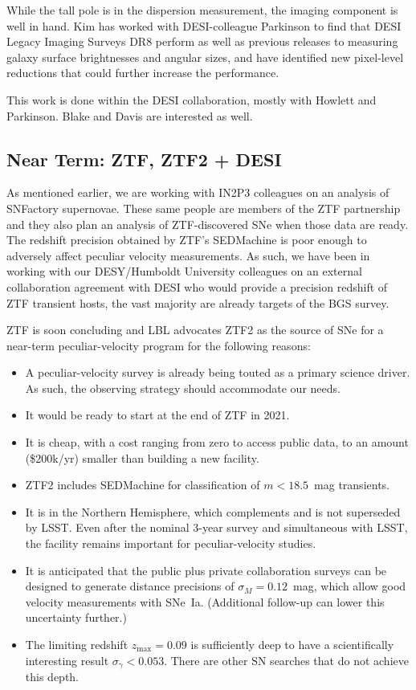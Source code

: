 While the tall pole is in the dispersion measurement, the
imaging component is well in hand. Kim has worked with DESI-colleague Parkinson to find that DESI Legacy Imaging Surveys DR8  perform
as well as previous releases to measuring galaxy surface brightnesses and angular sizes, and have identified new
pixel-level reductions that could further increase the performance.

This work is done within the DESI collaboration, mostly with Howlett and Parkinson.  Blake and Davis are interested as well.

\subsection{Near Term: ZTF, ZTF2 + DESI}
As mentioned earlier, we are working with IN2P3 colleagues on an analysis of SNFactory supernovae.
These same people are members of the ZTF partnership and they also plan an analysis of ZTF-discovered 
SNe when those data are ready.  The redshift precision obtained by ZTF's SEDMachine is poor enough
to adversely affect peculiar velocity measurements.  As such, we have been in working with our DESY/Humboldt University
colleagues on an external collaboration agreement with DESI who would provide a precision redshift of ZTF transient hosts,
the vast majority are already targets of the BGS survey.

ZTF is soon concluding and LBL advocates ZTF2 as the source of SNe for a near-term peculiar-velocity program
for the following reasons:
\begin{itemize}
\item A peculiar-velocity survey is already being touted as a primary science driver. As such,
the observing strategy should accommodate our needs.
\item It would be ready to start at the end of ZTF in 2021.
\item It is cheap, with a cost ranging from zero to access public data, to an amount (\$200k/yr) smaller
than building a new facility.
\item ZTF2 includes SEDMachine for classification of $m<18.5$~mag  transients.
\item It is in the Northern Hemisphere, which complements and is not superseded by LSST. 
Even after the nominal 3-year survey and simultaneous with LSST, the facility remains important for peculiar-velocity studies.
\item It is anticipated that the public plus private collaboration surveys can be designed to generate distance
precisions of $\sigma_M =0.12$~mag, which allow good velocity measurements with SNe~Ia.  (Additional follow-up can lower this uncertainty further.)
\item The limiting redshift $z_{\text{max}} =0.09$ is sufficiently deep  to have a scientifically interesting result $\sigma_\gamma < 0.053$.
There are other SN searches that do not achieve this depth.
\end{itemize}

